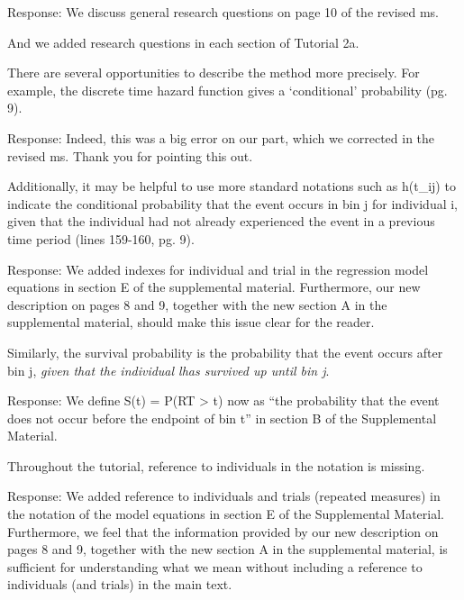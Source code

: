 \documentclass[
]{article}
\renewenvironment{quote}{\begin{leftbar}}{\end{leftbar}}
\begin{document}
Response: We discuss general research questions on page 10 of the
revised ms.

And we added research questions in each section of Tutorial 2a.

\begin{quote}
There are several opportunities to describe the method more precisely.
For example, the discrete time hazard function gives a `conditional'
probability (pg. 9).
\end{quote}

Response: Indeed, this was a big error on our part, which we corrected
in the revised ms. Thank you for pointing this out.

\begin{quote}
Additionally, it may be helpful to use more standard notations such as
h(t\_ij) to indicate the conditional probability that the event occurs
in bin j for individual i, given that the individual had not already
experienced the event in a previous time period (lines 159-160, pg. 9).
\end{quote}

Response: We added indexes for individual and trial in the regression
model equations in section E of the supplemental material. Furthermore,
our new description on pages 8 and 9, together with the new section A in
the supplemental material, should make this issue clear for the reader.

\begin{quote}
Similarly, the survival probability is the probability that the event
occurs after bin j, \emph{given that the individual lhas survived up
until bin j}.
\end{quote}

Response: We define S(t) = P(RT \textgreater{} t) now as ``the
probability that the event does not occur before the endpoint of bin t''
in section B of the Supplemental Material.

\begin{quote}
Throughout the tutorial, reference to individuals in the notation is
missing.
\end{quote}

Response: We added reference to individuals and trials (repeated
measures) in the notation of the model equations in section E of the
Supplemental Material. Furthermore, we feel that the information
provided by our new description on pages 8 and 9, together with the new
section A in the supplemental material, is sufficient for understanding
what we mean without including a reference to individuals (and trials)
in the main text.
\end{document}
